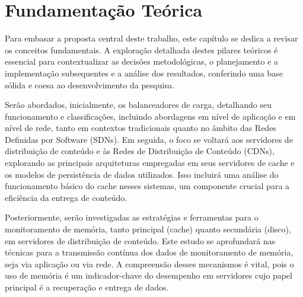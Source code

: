 

\chapter{Fundamentação Teórica}

Para embasar a proposta central deste trabalho, este capítulo se dedica a revisar os conceitos fundamentais. A exploração detalhada destes pilares teóricos é essencial para contextualizar as decisões metodológicas, o planejamento e a implementação subsequentes e a análise dos resultados, conferindo uma base sólida e coesa ao desenvolvimento da pesquisa.

Serão abordados, inicialmente, os balanceadores de carga, detalhando seu funcionamento e classificações, incluindo abordagens em nível de aplicação e em nível de rede, tanto em contextos tradicionais quanto no âmbito das Redes Definidas por Software (SDNs). Em seguida, o foco se voltará aos servidores de distribuição de conteúdo e às Redes de Distribuição de Conteúdo (CDNs), explorando as principais arquiteturas empregadas em seus servidores de cache e os modelos de persistência de dados utilizados. Isso incluirá uma análise do funcionamento básico do cache nesses sistemas, um componente crucial para a eficiência da entrega de conteúdo.

Posteriormente, serão investigadas as estratégias e ferramentas para o monitoramento de memória, tanto principal (cache) quanto secundária (disco), em servidores de distribuição de conteúdo. Este estudo se aprofundará nas técnicas para a transmissão contínua dos dados de monitoramento de memória, seja via aplicação ou via rede. A compreensão desses mecanismos é vital, pois o uso de memória é um indicador-chave do desempenho em servidores cujo papel principal é a recuperação e entrega de dados.

